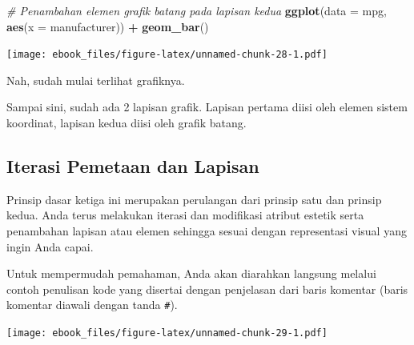 \documentclass[openany]{book}
\newenvironment{Shaded}{\begin{snugshade}}{\end{snugshade}}
\newcommand{\KeywordTok}[1]{\textcolor[rgb]{0.13,0.29,0.53}{\textbf{#1}}}
\newcommand{\DataTypeTok}[1]{\textcolor[rgb]{0.13,0.29,0.53}{#1}}
\newcommand{\StringTok}[1]{\textcolor[rgb]{0.31,0.60,0.02}{#1}}
\newcommand{\CommentTok}[1]{\textcolor[rgb]{0.56,0.35,0.01}{\textit{#1}}}
\newcommand{\OperatorTok}[1]{\textcolor[rgb]{0.81,0.36,0.00}{\textbf{#1}}}
\newcommand{\NormalTok}[1]{#1}
\begin{document}
\begin{Shaded}
\begin{Highlighting}[]
\CommentTok{# Penambahan elemen grafik batang pada lapisan kedua}
\KeywordTok{ggplot}\NormalTok{(}\DataTypeTok{data =}\NormalTok{ mpg, }\KeywordTok{aes}\NormalTok{(}\DataTypeTok{x =}\NormalTok{ manufacturer)) }\OperatorTok{+}\StringTok{ }
\StringTok{  }\KeywordTok{geom_bar}\NormalTok{()}
\end{Highlighting}
\end{Shaded}

\texttt{[image: ebook\_files/figure-latex/unnamed-chunk-28-1.pdf]}

Nah, sudah mulai terlihat grafiknya.

Sampai sini, sudah ada 2 lapisan grafik. Lapisan pertama diisi oleh
elemen sistem koordinat, lapisan kedua diisi oleh grafik batang.

\subsection{Iterasi Pemetaan dan
Lapisan}\label{iterasi-pemetaan-dan-lapisan}

Prinsip dasar ketiga ini merupakan perulangan dari prinsip satu dan
prinsip kedua. Anda terus melakukan iterasi dan modifikasi atribut
estetik serta penambahan lapisan atau elemen sehingga sesuai dengan
representasi visual yang ingin Anda capai.

Untuk mempermudah pemahaman, Anda akan diarahkan langsung melalui contoh
penulisan kode yang disertai dengan penjelasan dari baris komentar
(baris komentar diawali dengan tanda \texttt{\#}).

\begin{Shaded}
\end{Shaded}

\texttt{[image: ebook\_files/figure-latex/unnamed-chunk-29-1.pdf]}

\begin{Shaded}
\end{Shaded}
\end{document}
